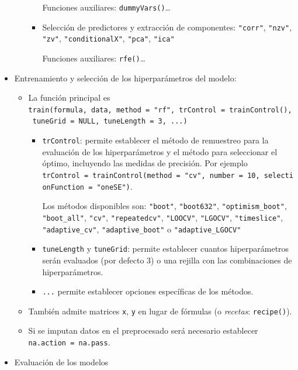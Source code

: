 \documentclass[]{book}
\theoremstyle{break}
\theoremstyle{definition}
\theoremstyle{definition}
\theoremstyle{definition}
\theoremstyle{remark}
\begin{document}
\begin{itemize}
\begin{itemize}
\begin{itemize}
      Funciones auxiliares: \texttt{dummyVars()}\ldots{}
    \item
      Selección de predictores y extracción de componentes:
      \texttt{"corr"}, \texttt{"nzv"}, \texttt{"zv"},
      \texttt{"conditionalX"}, \texttt{"pca"}, \texttt{"ica"}

      Funciones auxiliares: \texttt{rfe()}\ldots{}
    \end{itemize}
  \end{itemize}
\item
  Entrenamiento y selección de los hiperparámetros del modelo:

  \begin{itemize}
  \item
    La función principal es
    \texttt{train(formula,\ data,\ method\ =\ "rf",\ trControl\ =\ trainControl(),\ tuneGrid\ =\ NULL,\ tuneLength\ =\ 3,\ ...)}

    \begin{itemize}
    \item
      \texttt{trControl}: permite establecer el método de remuestreo
      para la evaluación de los hiperparámetros y el método para
      seleccionar el óptimo, incluyendo las medidas de precisión. Por
      ejemplo
      \texttt{trControl\ =\ trainControl(method\ =\ "cv",\ number\ =\ 10,\ selectionFunction\ =\ "oneSE")}.

      Los métodos disponibles son: \texttt{"boot"}, \texttt{"boot632"},
      \texttt{"optimism\_boot"}, \texttt{"boot\_all"}, \texttt{"cv"},
      \texttt{"repeatedcv"}, \texttt{"LOOCV"}, \texttt{"LGOCV"},
      \texttt{"timeslice"}, \texttt{"adaptive\_cv"},
      \texttt{"adaptive\_boot"} o \texttt{"adaptive\_LGOCV"}
    \item
      \texttt{tuneLength} y \texttt{tuneGrid}: permite establecer
      cuantos hiperparámetros serán evaluados (por defecto 3) o una
      rejilla con las combinaciones de hiperparámetros.
    \item
      \texttt{...} permite establecer opciones específicas de los
      métodos.
    \end{itemize}
  \item
    También admite matrices \texttt{x}, \texttt{y} en lugar de fórmulas
    (o \emph{recetas}: \texttt{recipe()}).
  \item
    Si se imputan datos en el preprocesado será necesario establecer
    \texttt{na.action\ =\ na.pass}.
  \end{itemize}
\item
  Evaluación de los modelos


\end{itemize}
\end{document}
